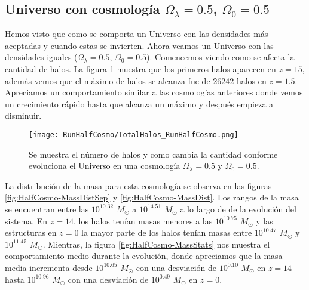 \subsection{Universo con cosmología \texorpdfstring{$\Omega_\lambda = 0.5$, $\Omega_0 = 0.5$ }{Omega lambda = 0.5, Omega 0 = 0.5} }

Hemos visto que como se comporta un Universo con las densidades más aceptadas y cuando estas se invierten. Ahora veamos un Universo con las densidades iguales ($\Omega_\lambda = 0.5$, $\Omega_0 = 0.5$). Comencemos viendo como se afecta la cantidad de halos. La figura \ref{fig:HalfCosmo-TotalHalos} muestra que los primeros halos aparecen en $z=15$, además vemos que el máximo de halos se alcanza fue de $26242$ halos en $z=1.5$. Apreciamos un comportamiento similar a las cosmologías anteriores donde vemos un crecimiento rápido hasta que alcanza un máximo y después empieza a disminuir.

\begin{figure}[H]
    \centering
    \texttt{[image: RunHalfCosmo/TotalHalos\_RunHalfCosmo.png]}
    \caption[Evolución del número de halos en un Universo $\Omega_\lambda = 0.5 $, $\Omega_0 = 0.5$]{\footnotesize Se muestra el número de halos y como cambia la cantidad conforme evoluciona el Universo en una cosmología $\Omega_\lambda = 0.5 $ y $\Omega_0 = 0.5$.}    
    \label{fig:HalfCosmo-TotalHalos}
\end{figure}

La distribución de la masa para esta cosmología se observa en las figuras \ref{fig:HalfCosmo-MassDistSep} y \ref{fig:HalfCosmo-MassDist}. Los rangos de la masa se encuentran entre las $10^{10.32}$ $M_\odot$ a $10^{14.51}$ $M_\odot$ a lo largo de de la evolución del sistema. En $z=14$, los halos tenían masas menores a las $10^{10.75}$ $M_\odot$ y las estructuras en $z=0$ la mayor parte de los halos tenían masas entre $10^{10.47}$ $M_\odot$ y $10^{11.45}$ $M_\odot$. Mientras, la figura \ref{fig:HalfCosmo-MassStats} nos muestra el comportamiento medio durante la evolución, donde apreciamos que la masa media incrementa desde $10^{10.65}$ $M_\odot$ con una desviación de $10^{0.10}$ $M_\odot$ en $z=14$ hasta $10^{10.96}$ $M_\odot$ con una desviación de $10^{0.49}$ $M_\odot$ en $z=0$.

